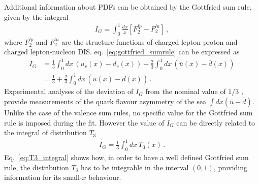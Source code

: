 %
Additional information about PDFs can be obtained by the Gottfried sum rule, given by the integral
\begin{align}
    \label{eq:gottfried_sumrule}
    I_G = \int_0^1 \frac{dx}{x} \left[F_2^{lp} - F_2^{ln}\right]\,,
\end{align}
where $F_2^{lp}$ and $F_2^{ln}$ are the structure functions of charged lepton-proton and charged lepton-nucleon DIS.
eq.~\eqref{eq:gottfried_sumrule} can be expressed as
\begin{align}
    \label{eq:gottfried_sumrule_1}
    I_G &= \frac{1}{3}\int_0^1 dx\,\left(u_v\left(x\right) - d_v\left(x\right)\right) 
    + \frac{2}{3}\int_0^1 dx\,\left(\bar{u}\left(x\right) - \bar{d}\left(x\right)\right) \nonumber \\
    & = \frac{1}{3} + \frac{2}{3}\int_0^1 dx\,\left(\bar{u}\left(x\right) - \bar{d}\left(x\right)\right)\,. 
\end{align}
Experimental analyses of the deviation of $I_G$ from the nominal value of $1/3$ \cite{Amaudruz:1991at},
provide measurements of the quark flavour asymmetry of the sea $\int dx \left(\bar{u} - \bar{d}\right)$.
Unlike the case of the valence sum rules, no specific value for the Gottfried sum rule is imposed
during the fit.
However the value of $I_G$ can be directly related to the integral of distribution $T_3$ 
\begin{align}
    \label{eq:T3_integral}
    I_G = \frac{1}{3}\int_0^1 dx\, T_3\left(x\right)\,. 
\end{align}
Eq.~\eqref{eq:T3_integral} shows how, in order to have a well defined Gottfried sum rule, the distribution
$T_3$ has to be integrable in the interval $\left(0,1\right)$, providing information for its small-$x$ behaviour.



